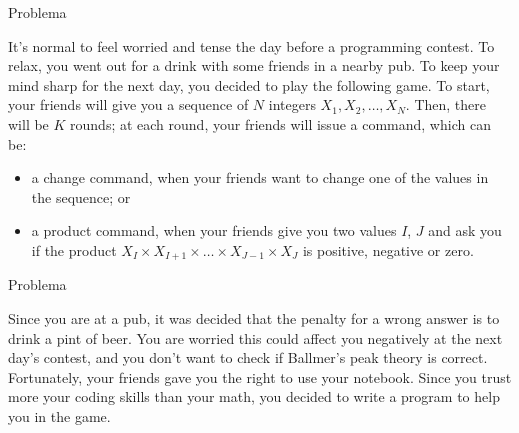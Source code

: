 
\begin{frame}[fragile]{Problema}

It’s normal to feel worried and tense the day before a programming contest. To relax, you went out 
for a drink with some friends in a nearby pub. To keep your mind sharp for the next day, you 
decided to play the following game. To start, your friends will give you a sequence of $N$ 
integers $X_1, X_2, \ldots, X_N$.  Then, there will be $K$ rounds; at each round, your friends 
will issue a command, which can be:

\begin{itemize}
    \item a change command, when your friends want to change one of the values in the sequence; or
    \item a product command, when your friends give you two values $I$, $J$ and ask you if the 
        product $X_I \times X_{I+1} \times \ldots \times X_{J-1} \times X_J$ is positive, negative 
        or zero.
\end{itemize}

\end{frame}


\begin{frame}[fragile]{Problema}

Since you are at a pub, it was decided that the penalty for a wrong answer is to drink a pint 
of beer. You are worried this could affect you negatively at the next day’s contest, and you don’t
want to check if Ballmer’s peak theory is correct. Fortunately, your friends gave you the right to
use your notebook. Since you trust more your coding skills than your math, you decided to write a 
program to help you in the game.

\end{frame}


